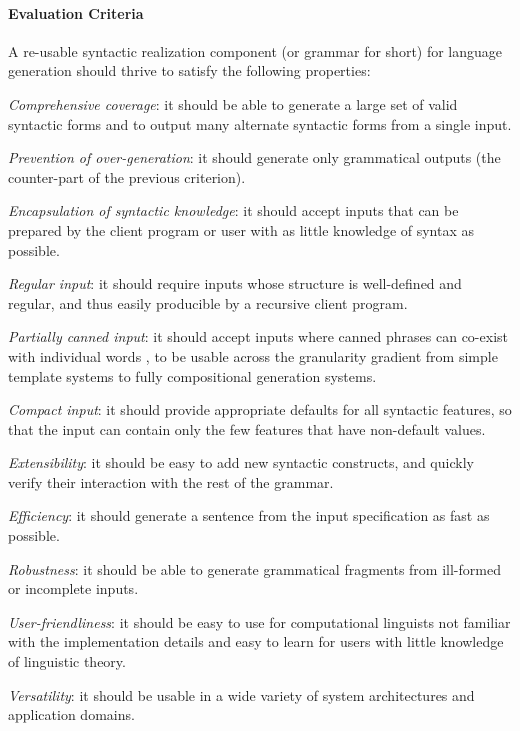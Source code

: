 \paragraph{Evaluation Criteria}

A re-usable syntactic realization component (or grammar for short) for language
generation should thrive to satisfy the following properties:
\begin{zenumerate}
\item {\em Comprehensive coverage}: it should be able to generate a large
  set of valid syntactic forms and to output many alternate syntactic forms
  from a single input.

\item {\em Prevention of over-generation}: it should generate only
  grammatical outputs (the counter-part of the previous criterion).

\item {\em Encapsulation of syntactic knowledge}: it should accept inputs
  that can be prepared by the client program or user with as little
  knowledge of syntax as possible.

\item {\em Regular input}: it should require inputs whose structure is
  well-defined and regular, and thus easily producible by a recursive
  client program.

\item {\em Partially canned input}: it should accept inputs where canned
  phrases can co-exist with individual words \cite{reiter95}, to be
  usable across the granularity gradient from simple template systems to
  fully compositional generation systems.

\item {\em Compact input}: it should provide appropriate defaults for all
  syntactic features, so that the input can contain only the few features
  that have non-default values.

\item {\em Extensibility}: it should be easy to add new syntactic
  constructs, and quickly verify their interaction with the rest of the grammar.

\item {\em Efficiency}: it should generate a sentence from the input
  specification as fast as possible.

\item {\em Robustness}: it should be able to generate grammatical fragments
  from ill-formed or incomplete inputs.

\item {\em User-friendliness}: it should be easy to use for computational
  linguists not familiar with the implementation details and easy to learn for
  users with little knowledge of linguistic theory.

\item {\em Versatility}: it should be usable in a wide variety of  
  system architectures and application domains.
\end{zenumerate}

